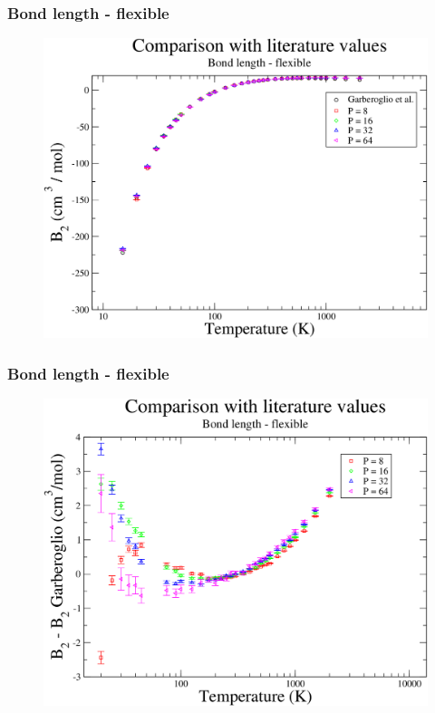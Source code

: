 \documentclass[xcolor=svgnames]{beamer}
\begin{document}
	\begin{frame}
	\frametitle{Bond length - flexible}
	\begin{figure}
	\centering
	\includegraphics[scale=0.18,keepaspectratio]{8svBLResults.png}
	\end{figure}
	
	\end{frame}

	\begin{frame}
	\frametitle{Bond length - flexible}
	\begin{figure}
	\centering
	\includegraphics[scale=0.18,keepaspectratio]{8svBLResultsDiff.png}
	\end{figure}
	\end{frame}
\end{document}

